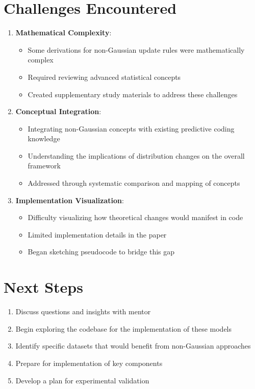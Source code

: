 \documentclass{article}
\begin{document}
\section{Challenges Encountered}

\begin{enumerate}
  \item \textbf{Mathematical Complexity}:
  \begin{itemize}
    \item Some derivations for non-Gaussian update rules were mathematically complex
    \item Required reviewing advanced statistical concepts
    \item Created supplementary study materials to address these challenges
  \end{itemize}

  \item \textbf{Conceptual Integration}:
  \begin{itemize}
    \item Integrating non-Gaussian concepts with existing predictive coding knowledge
    \item Understanding the implications of distribution changes on the overall framework
    \item Addressed through systematic comparison and mapping of concepts
  \end{itemize}

  \item \textbf{Implementation Visualization}:
  \begin{itemize}
    \item Difficulty visualizing how theoretical changes would manifest in code
    \item Limited implementation details in the paper
    \item Began sketching pseudocode to bridge this gap
  \end{itemize}
\end{enumerate}

\section{Next Steps}

\begin{enumerate}
  \item Discuss questions and insights with mentor
  \item Begin exploring the codebase for the implementation of these models
  \item Identify specific datasets that would benefit from non-Gaussian approaches
  \item Prepare for implementation of key components
  \item Develop a plan for experimental validation
\end{enumerate}
\end{document}
